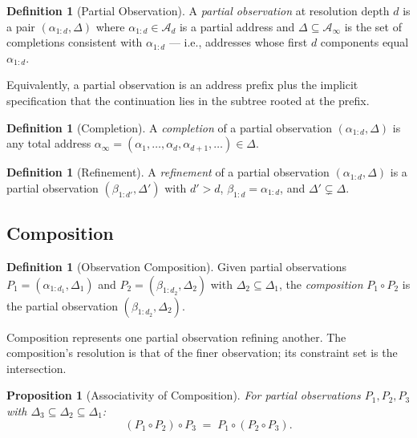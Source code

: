 \documentclass[11pt,twocolumn,a4paper]{article}
\newtheorem{proposition}[theorem]{Proposition}
\theoremstyle{definition}
\newtheorem{definition}[theorem]{Definition}
\theoremstyle{remark}
\newcommand{\Ac}{\mathcal{A}}
\begin{document}
\begin{definition}[Partial Observation]
\label{def:partial}
A \emph{partial observation} at resolution depth $d$ is a pair $(\alpha_{1:d}, \Delta)$ where $\alpha_{1:d} \in \Ac_d$ is a partial address and $\Delta \subseteq \Ac_\infty$ is the set of completions consistent with $\alpha_{1:d}$ --- i.e., addresses whose first $d$ components equal $\alpha_{1:d}$.
\end{definition}

Equivalently, a partial observation is an address prefix plus the implicit specification that the continuation lies in the subtree rooted at the prefix.

\begin{definition}[Completion]
\label{def:completion}
A \emph{completion} of a partial observation $(\alpha_{1:d}, \Delta)$ is any total address $\alpha_\infty = (\alpha_1, \ldots, \alpha_d, \alpha_{d+1}, \ldots) \in \Delta$.
\end{definition}

\begin{definition}[Refinement]
\label{def:refinement}
A \emph{refinement} of a partial observation $(\alpha_{1:d}, \Delta)$ is a partial observation $(\beta_{1:d'}, \Delta')$ with $d' > d$, $\beta_{1:d} = \alpha_{1:d}$, and $\Delta' \subsetneq \Delta$.
\end{definition}

\subsection{Composition}

\begin{definition}[Observation Composition]
\label{def:compose}
Given partial observations $P_1 = (\alpha_{1:d_1}, \Delta_1)$ and $P_2 = (\beta_{1:d_2}, \Delta_2)$ with $\Delta_2 \subseteq \Delta_1$, the \emph{composition} $P_1 \circ P_2$ is the partial observation $(\beta_{1:d_2}, \Delta_2)$.
\end{definition}

Composition represents one partial observation refining another. The composition's resolution is that of the finer observation; its constraint set is the intersection.

\begin{proposition}[Associativity of Composition]
\label{prop:assoc}
For partial observations $P_1, P_2, P_3$ with $\Delta_3 \subseteq \Delta_2 \subseteq \Delta_1$:
\[
(P_1 \circ P_2) \circ P_3 \;=\; P_1 \circ (P_2 \circ P_3).
\]
\end{proposition}
\end{document}
